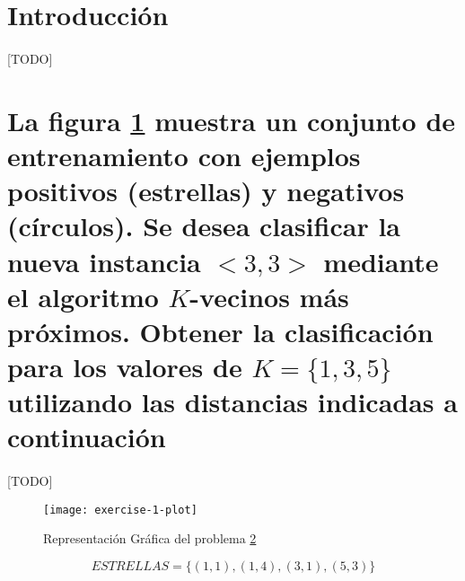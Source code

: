 \documentclass{article}
\begin{document}
	\maketitle %

	\thispagestyle{fancy} %



	\begin{abstract}
		\noindent [TODO ]
	\end{abstract}



	\section{Introducción}
	\label{sec:introducción}

		\paragraph{}
		[TODO]

	\section{La figura \ref{e1:plot} muestra un conjunto de entrenamiento con ejemplos positivos (estrellas) y negativos (círculos). Se desea clasificar la nueva instancia $<3,3>$ mediante el algoritmo $K$-vecinos más próximos. Obtener la clasificación para los valores de $K=\{ 1, 3, 5\}$ utilizando las distancias indicadas a continuación}
	\label{sec:e1}

		\paragraph{}
		[TODO]

		\begin{figure}[h]
			\begin{center}
				\texttt{[image: exercise-1-plot]}
			\end{center}
			\caption{Representación Gráfica del problema \ref{sec:e1}}
			\label{e1:plot}
		\end{figure}

		\begin{equation}
		\label{eq:estrellas}
			ESTRELLAS = \{(1,1), (1,4), (3,1), (5,3)\}
		\end{equation}
\end{document}
